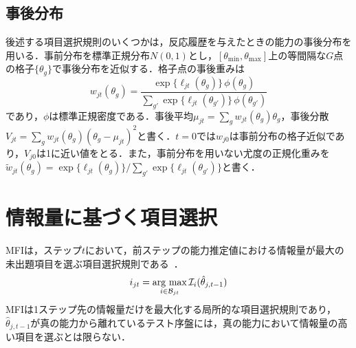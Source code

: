 \documentclass[a4paper,12pt,oneside,openany]{jsbook}
\begin{document}
\section{事後分布}\label{sec:posterior}

後述する項目選択規則のいくつかは，反応履歴を与えたときの能力の事後分布を用いる．事前分布を標準正規分布$N(0,1)$とし，$[\theta_{\min},\theta_{\max}]$上の等間隔な$G$点の格子$\{\theta_g\}$で事後分布を近似する．格子点の事後重みは
\begin{equation}
 w_{jt}(\theta_g)=\frac{\exp\{\ell_{jt}(\theta_g)\}\,\phi(\theta_g)}{\sum_{g'}\exp\{\ell_{jt}(\theta_{g'})\}\,\phi(\theta_{g'})}
 \label{eq:post}
\end{equation}
であり，$\phi$は標準正規密度である．事後平均$\mu_{jt}=\sum_gw_{jt}(\theta_g)\theta_g$，事後分散$V_{jt}=\sum_gw_{jt}(\theta_g)(\theta_g-\mu_{jt})^2$と書く．$t=0$では$w_{j0}$は事前分布の格子近似であり，$V_{j0}$は1に近い値をとる．また，事前分布を用いない尤度の正規化重みを$\tilde w_{jt}(\theta_g)=\exp\{\ell_{jt}(\theta_g)\}/\sum_{g'}\exp\{\ell_{jt}(\theta_{g'})\}$と書く．

\chapter{情報量に基づく項目選択}\label{sec:info}

MFIは，ステップ$t$において，前ステップの能力推定値における情報量が最大の未出題項目を選ぶ項目選択規則である~\cite{Lord1980}．
\begin{equation}
 i_{jt}=\mathop{\rm arg~max}_{i\in\mathcal{B}_{jt}}\mathcal{I}_i(\hat\theta_{j,t-1})
 \label{eq:mfi}
\end{equation}
MFIは1ステップ先の情報量だけを最大化する局所的な項目選択規則であり，$\hat\theta_{j,t-1}$が真の能力から離れているテスト序盤には，真の能力において情報量の高い項目を選ぶとは限らない．
\end{document}
